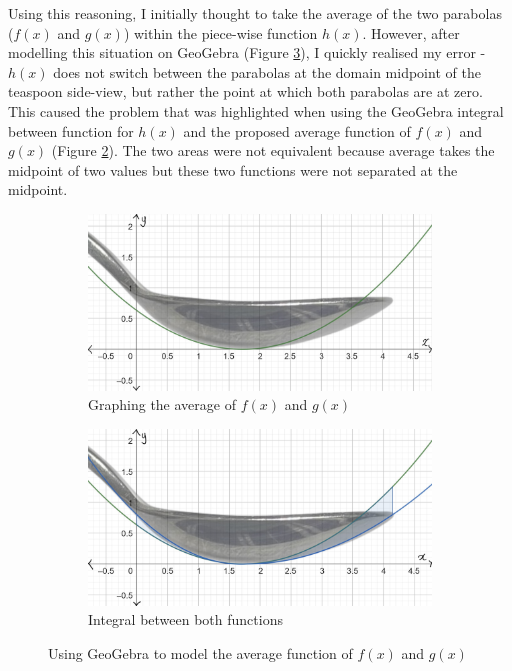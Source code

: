 \documentclass[12pt]{article}
\begin{document}
Using this reasoning, I initially thought to take the average of the two parabolas ($f(x)$ and $g(x)$) within the piece-wise function $h(x)$. However, after modelling this situation on GeoGebra (Figure \ref{fig:avg problem}), I quickly realised my error - $h(x)$ does not switch between the parabolas at the domain midpoint of the teaspoon side-view, but rather the point at which both parabolas are at zero. This caused the problem that was highlighted when using the GeoGebra integral between function for $h(x)$ and the proposed average function of $f(x)$ and $g(x)$ (Figure \ref{fig:skill-issue}). The two areas were not equivalent because average takes the midpoint of two values but these two functions were not separated at the midpoint. 

\pagebreak

\begin{figure}[h]
     \centering
     \begin{subfigure}[b]{0.45\textwidth}
         \centering
         \includegraphics[width=\textwidth]{images/avg parab.jpg}
         \caption{Graphing the average of $f(x)$ and $g(x)$}
         \label{fig:avg.parab}
     \end{subfigure}
     \hfill
     \begin{subfigure}[b]{0.45\textwidth}
         \centering
         \includegraphics[width=\textwidth]{images/uneq area.jpg}
         \caption{Integral between both functions}
         \label{fig:skill-issue}
     \end{subfigure}
     \hfill
        \caption{Using GeoGebra to model the average function of $f(x)$ and $g(x)$}
        \label{fig:avg problem}
\end{figure}
\end{document}
